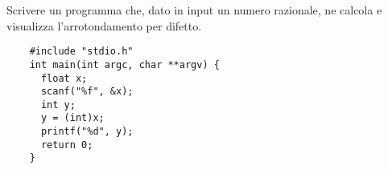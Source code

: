 \begin{example}
  Scrivere un programma che, dato in input un numero razionale, ne calcola e visualizza l'arrotondamento per difetto.
  \begin{verbatim}
    #include "stdio.h"
    int main(int argc, char **argv) {
      float x;
      scanf("%f", &x);
      int y;
      y = (int)x;
      printf("%d", y);
      return 0;
    }\end{verbatim}
\end{example}